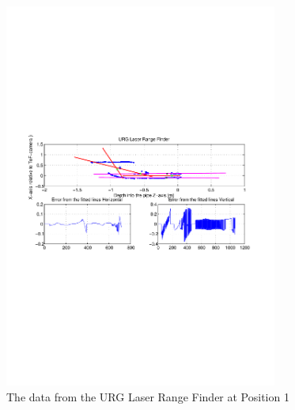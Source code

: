 \begin{figure}[htbp]
    \centering
    \includegraphics[width=0.8\textwidth]{pics/pos1-irregular-urg-2d}
    \caption{The data from the URG Laser Range Finder at Position 1}
    \label{chap7:fig-pos1-irregular-urg-2d}
\end{figure}

